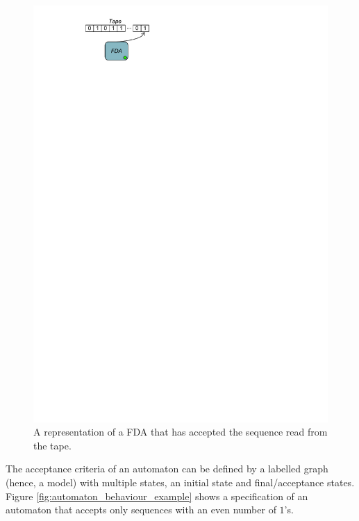 \begin{figure}[h]
\begin{center}
  \includegraphics[scale=1, trim=3.5cm 25.4cm 12.4cm 0.6cm,
  clip]{imgs/automaton_representation_accepted.pdf}
  \caption{A representation of a FDA that has accepted the sequence read from the tape.}
  \label{fig:automaton_representation_accepted}
\end{center}
\end{figure}

The acceptance criteria of an automaton can be defined by a labelled graph (hence, a model) with multiple states, an initial state and final/acceptance states. Figure \ref{fig:automaton_behaviour_example} shows a specification of an automaton that accepts only sequences with an even number of $1$'s.


